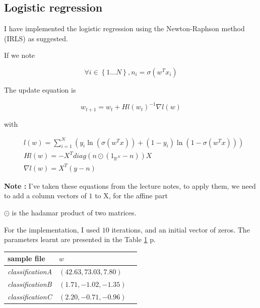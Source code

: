 \documentclass[a4paper, 11pt]{article}
\newenvironment{note}
{\begin{framed} \textbf{Note : }}
{\end{framed}}
\newcommand{\file}[1]{\emph{#1}}
\newcommand{\Table}[1]{Table \ref{#1} p. \pageref{#1}}
\newcommand{\intn}[2]{\left\{ #1 \dots #2 \right\}}
\begin{document}
\subsection{Logistic regression}
I have implemented the logistic regression using the
Newton-Raphson method (IRLS) as suggested.

If we note

\begin{equation*}
  \forall i \in \intn{1}{N}, n_i = \sigma(w^T x_i)
\end{equation*}

The update equation is

\begin{equation*}
  w_{t + 1} = w_t + Hl(w_t)^{-1} \nabla l(w)
\end{equation*}

with

\begin{align*}
  & l(w) = \sum_{i = 1}^N \left(y_i \ln{(\sigma(w^T x))} + (1 - y_i) \ln{(1 - \sigma{(w^T x)})} \right) \\
  & Hl(w) = -X^T diag(n \odot (1_{\mathbb{R}^N} - n)) X \\
  & \nabla l(w) = X^T (y - n)
\end{align*}

\begin{note}
  I've taken these equations from the lecture notes, to apply them, we need
  to add a column vectors of $1$ to X, for the affine part

  $\odot$ is the hadamar product of two matrices.
\end{note}

For the implementation, I used $10$ iterations, and an initial
vector of zeros. The parameters learnt are presented in the \Table{tab:ParamLogReg}

\begin{table}[h!]
  \centering
  \begin{tabular}{| l | l | l |}
    \hline
    sample file & $w$ \\
    \hline
    \file{classificationA} & $(42.63, 73.03, 7.80)$ \\
    \file{classificationB} & $(1.71, -1.02, -1.35)$ \\
    \file{classificationC} & $(2.20, -0.71, -0.96)$ \\
    \hline
  \end{tabular}
   \label{tab:ParamLogReg}
\end{table}
\end{document}
